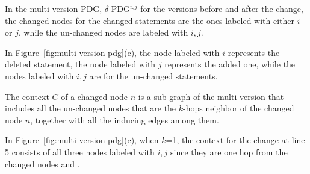 \begin{Definition}
In the multi-version PDG, $\delta$-PDG$^{i,j}$ for the versions before
and after the change, the changed nodes for the changed statements are
the ones labeled with either $i$ or $j$, while the un-changed nodes
are labeled with $i,j$.
\end{Definition}

In Figure~\ref{fig:multi-version-pdg}(c), the node labeled with $i$
represents the deleted statement, the node labeled with $j$ represents
the added one, while the nodes labeled with $i,j$ are for the un-changed
statements.


\begin{Definition}[Context]
The context $C$ of a changed node $n$ is a sub-graph of the
multi-version {\mvpdg} that includes all the un-changed nodes that are the
$k$-hops neighbor of the changed node $n$, together with all the
inducing edges among them.
\end{Definition}

In Figure~\ref{fig:multi-version-pdg}(c), when $k$=1, the context for
the change at line 5 consists of all three nodes labeled with $i,j$
since they are one hop from the changed nodes  and .





